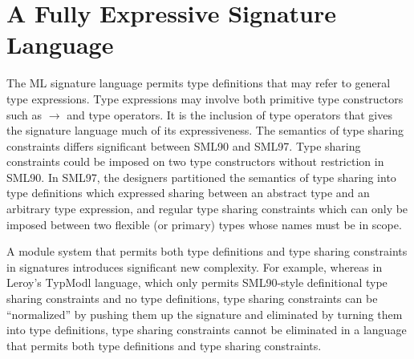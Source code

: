 \section{A Fully Expressive Signature Language}
The ML signature language permits type definitions that may refer to general type expressions. Type expressions may involve both primitive type constructors such as $\rightarrow$ and type operators. It is the inclusion of type operators that gives the signature language much of its expressiveness. The semantics of type sharing constraints differs significant between SML90 and SML97. Type sharing constraints could be imposed on two type constructors without restriction in SML90. In SML97, the designers partitioned the semantics of type sharing into type definitions which expressed sharing between an abstract type and an arbitrary type expression, and regular type sharing constraints which can only be imposed between two flexible (or primary) types whose names must be in scope. 

A module system that permits both type definitions and type sharing constraints in signatures introduces significant new complexity. For example, whereas in Leroy's \cite{Leroy-generativity} TypModl language, which only permits SML90-style definitional type sharing constraints and no type definitions, type sharing constraints can be ``normalized'' by pushing them up the signature and eliminated by turning them into type definitions, type sharing constraints cannot be eliminated in a language that permits both type definitions and type sharing constraints.